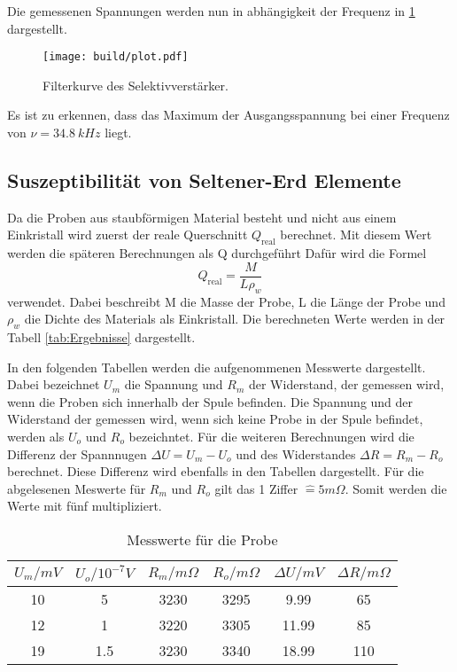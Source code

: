\noindent Die gemessenen Spannungen werden nun in abhängigkeit der Frequenz in  \ref{fig:filter} dargestellt.

\begin{figure}[H]
    \centering
    \texttt{[image: build/plot.pdf]}
    \caption{Filterkurve des Selektivverstärker.}
    \label{fig:filter}
\end{figure} 

\noindent Es ist zu erkennen, dass das Maximum der Ausgangsspannung bei einer Frequenz von $\nu = \qty{34.8}{kHz}$ liegt.

\subsection{Suszeptibilität von Seltener-Erd Elemente}

Da die Proben aus staubförmigen Material besteht und nicht aus einem Einkristall wird zuerst der reale Querschnitt $Q_\text{real}$ berechnet.
Mit diesem Wert werden die späteren Berechnungen als Q durchgeführt
Dafür wird die Formel 
\begin{equation}
    Q_\text{real} = \frac{M}{L \rho_w}
\end{equation}
verwendet.
Dabei beschreibt M die Masse der Probe, L die Länge der Probe und $\rho_w$ die Dichte des Materials als Einkristall.
Die berechneten Werte werden in der Tabell \ref{tab:Ergebnisse} dargestellt.

\noindent In den folgenden Tabellen werden die aufgenommenen Messwerte dargestellt. Dabei bezeichnet $U_m$ die Spannung und $R_m$ der Widerstand, der gemessen wird, wenn die Proben sich
innerhalb der Spule befinden. 
Die Spannung und der Widerstand der gemessen wird, wenn sich keine Probe in der Spule befindet, werden als $U_o$ und $R_o$ bezeichntet.
Für die weiteren Berechnungen wird die Differenz der Spannnugen $\Delta U = U_m -U_o$ und des Widerstandes $\Delta R = R_m - R_o$ berechnet.
Diese Differenz wird ebenfalls in den Tabellen dargestellt.
Für die abgelesenen Meswerte für $R_m$ und $R_o$ gilt das 1 Ziffer $\widehat{=} 5 m \Omega$. 
Somit werden die Werte mit fünf multipliziert.

\begin{table}[H]
    \centering
    \caption{Messwerte für die Probe }
    \label{tab:Nd}
    \begin{tabular}{c c c c c c}
        \toprule
        $U_m / mV$ & $U_o / 10^{-7}V$ & $R_m /m\Omega$ & $R_o /m\Omega$ & $\Delta U /mV$ & $\Delta R /m\Omega$ \\
        \midrule        
        10  & 5    & 3230  & 3295  & 9.99  &   65   \\ 
        12  & 1    & 3220  & 3305  & 11.99  &  85    \\ 
        19  & 1.5  & 3230  & 3340  & 18.99  &  110    \\ 
        \bottomrule
    \end{tabular}
\end{table}


